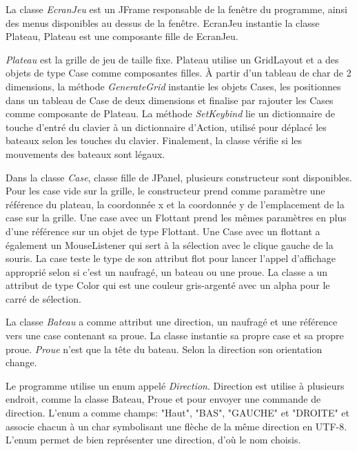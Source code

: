\documentclass[11pt, french]{article} %
\begin{document}
La classe \textit{EcranJeu} est un JFrame responsable de la fenêtre du programme, ainsi des menus disponibles au dessus de la fenêtre. EcranJeu instantie la classe Plateau, Plateau est une composante fille de EcranJeu. 
\newline

\textit{Plateau} est la grille de jeu de taille fixe. Plateau utilise un GridLayout et a des objets de type Case comme composantes filles. À partir d'un tableau de char de 2 dimensions, la méthode \textit{GenerateGrid} instantie les objets Cases, les positionnes dans un tableau de Case de deux dimensions et finalise par rajouter les Cases comme composante de Plateau. La méthode \textit{SetKeybind} lie un dictionnaire de touche d'entré du clavier à un dictionnaire d'Action, utilisé pour déplacé les bateaux selon les touches du clavier. Finalement, la classe vérifie si les mouvements des bateaux sont légaux.
\newline

Dans la classe \textit{Case}, classe fille de JPanel, plusieurs constructeur sont disponibles. Pour les case vide sur la grille, le constructeur prend comme paramètre une référence du plateau, la coordonnée x et la coordonnée y de l'emplacement de la case sur la grille. Une case avec un Flottant prend les mêmes paramètres en plus d'une référence sur un objet de type Flottant. Une Case avec un flottant a également un MouseListener qui sert à la sélection avec le clique gauche de la souris. La case teste le type de son attribut flot pour lancer l'appel d'affichage approprié selon si c'est un naufragé, un bateau ou une proue. La classe a un attribut de type Color qui est une couleur gris-argenté avec un alpha pour le carré de sélection.
\newline

La classe \textit{Bateau} a comme attribut une direction, un naufragé et une référence vers une case contenant sa proue. La classe instantie sa propre case et sa propre proue. \textit{Proue} n'est que la tête du bateau. Selon la direction son orientation change.
\newline

Le programme utilise un enum appelé \textit{Direction}. Direction est utilise à plusieurs endroit, comme la classe Bateau, Proue et pour envoyer une commande de direction. L'enum a comme champs: "Haut", "BAS", "GAUCHE" et "DROITE" et associe chacun à un char symbolisant une flèche de la même direction en UTF-8. L'enum permet de bien représenter une direction, d'où le nom choisis.
\end{document}
